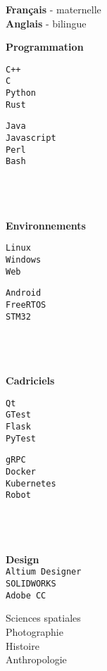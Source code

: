 \documentclass[9pt]{developercv} %
\begin{document}
\begin{minipage}[t]{0.18\textwidth}
		\textbf{Français} - maternelle\\
		\textbf{Anglais} - bilingue

		\textbf{Programmation}\\
		\begin{minipage}[t]{0.5\textwidth}
			\texttt{C++}\\
			\texttt{C}\\
			\texttt{Python}\\
			\texttt{Rust}
		\end{minipage}
		\begin{minipage}[t]{0.45\textwidth}
			\texttt{Java}\\
			\texttt{Javascript}\\
			\texttt{Perl}\\
			\texttt{Bash}
		\end{minipage}
		\\\\\\
		\textbf{Environnements}\\
		\begin{minipage}[t]{0.5\textwidth}
			\texttt{Linux}\\
			\texttt{Windows}\\
			\texttt{Web}
		\end{minipage}
		\begin{minipage}[t]{0.45\textwidth}
			\texttt{Android}\\
			\texttt{FreeRTOS}\\
			\texttt{STM32}
		\end{minipage}
		\\\\\\
		\textbf{Cadriciels}\\
		\begin{minipage}[t]{0.5\textwidth}
			\texttt{Qt}\\
			\texttt{GTest}\\
			\texttt{Flask}\\
			\texttt{PyTest}
		\end{minipage}
		\begin{minipage}[t]{0.45\textwidth}
			\texttt{gRPC}\\
			\texttt{Docker}\\
			\texttt{Kubernetes}\\
			\texttt{Robot}
		\end{minipage}
		\\\\\\
		\textbf{Design}\\
		\texttt{Altium Designer}\\
		\texttt{SOLIDWORKS}\\
		\texttt{Adobe CC}

		Sciences spatiales\\
		Photographie\\
		Histoire\\
		Anthropologie
\end{minipage}

\end{document}
